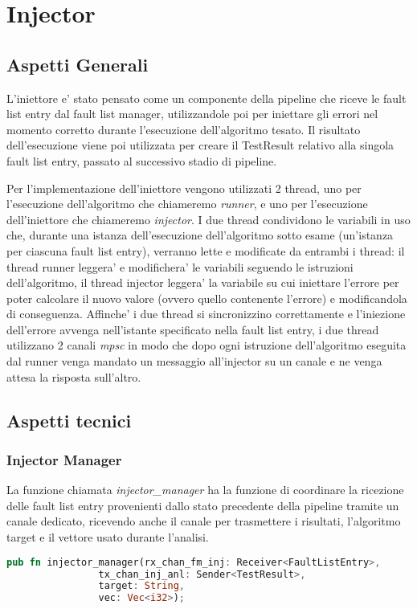 \section{Injector}
\subsection{Aspetti Generali}
L'iniettore e' stato pensato come un componente della pipeline che riceve le fault list entry dal fault list manager, utilizzandole poi per iniettare gli errori nel momento corretto durante l'esecuzione dell'algoritmo tesato. Il risultato dell'esecuzione viene poi utilizzata per creare il TestResult relativo alla singola fault list entry, passato al successivo stadio di pipeline. 

Per l'implementazione dell'iniettore vengono utilizzati 2 thread, uno per l'esecuzione dell'algoritmo che chiameremo \textit{runner}, e uno per l'esecuzione dell'i\-niettore che chiameremo \textit{injector}. I due thread condividono le variabili in uso che, durante una istanza dell'esecuzione dell'algoritmo sotto esame (un'istanza per ciascuna fault list entry), verranno lette e modificate da entrambi i thread: il thread runner leggera' e modifichera' le variabili seguendo le istruzioni dell'algo\-ritmo, il thread injector leggera' la variabile su cui iniettare l'errore per poter calcolare il nuovo valore (ovvero quello contenente l'errore) e modificandola di conseguenza. Affinche' i due thread si sincronizzino correttamente e l'iniezione dell'errore avvenga nell'istante specificato nella fault list entry, i due thread utilizzano 2 canali \textit{mpsc} in modo che dopo ogni istruzione dell'algoritmo eseguita dal runner venga mandato un messaggio all'injector su un canale e ne venga attesa la risposta sull'altro.

\subsection{Aspetti tecnici}
\subsubsection{Injector Manager}
La funzione chiamata \textit{injector\_manager} ha la funzione di coordinare la ricezione delle fault list entry provenienti dallo stato precedente della pipeline tramite un canale dedicato, ricevendo anche il canale per trasmettere i risultati, l'algoritmo target e il vettore usato durante l'analisi.

\begin{lstlisting}[language=Rust, style=boxed]
pub fn injector_manager(rx_chan_fm_inj: Receiver<FaultListEntry>,
                tx_chan_inj_anl: Sender<TestResult>,
                target: String,
                vec: Vec<i32>);
\end{lstlisting}

